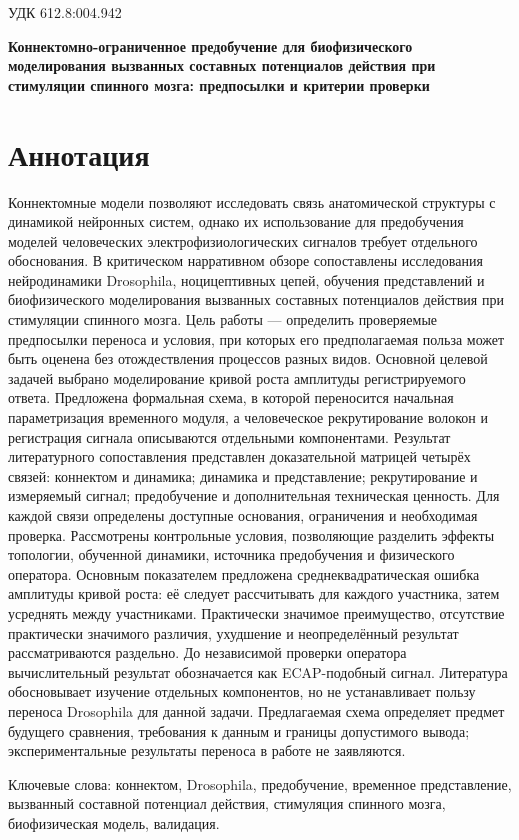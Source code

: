 \documentclass[12pt,a4paper]{article}
\begin{document}
\noindent УДК 612.8:004.942\par
\begin{center}\bfseries\fontsize{14}{17}\selectfont Коннектомно-ограниченное предобучение для биофизического моделирования вызванных составных потенциалов действия при стимуляции спинного мозга: предпосылки и критерии проверки\end{center}
\section*{Аннотация}
Коннектомные модели позволяют исследовать связь анатомической структуры с динамикой нейронных систем, однако их использование для предобучения моделей человеческих электрофизиологических сигналов требует отдельного обоснования. В критическом нарративном обзоре сопоставлены исследования нейродинамики Drosophila, ноцицептивных цепей, обучения представлений и биофизического моделирования вызванных составных потенциалов действия при стимуляции спинного мозга. Цель работы — определить проверяемые предпосылки переноса и условия, при которых его предполагаемая польза может быть оценена без отождествления процессов разных видов. Основной целевой задачей выбрано моделирование кривой роста амплитуды регистрируемого ответа. Предложена формальная схема, в которой переносится начальная параметризация временного модуля, а человеческое рекрутирование волокон и регистрация сигнала описываются отдельными компонентами. Результат литературного сопоставления представлен доказательной матрицей четырёх связей: коннектом и динамика; динамика и представление; рекрутирование и измеряемый сигнал; предобучение и дополнительная техническая ценность. Для каждой связи определены доступные основания, ограничения и необходимая проверка. Рассмотрены контрольные условия, позволяющие разделить эффекты топологии, обученной динамики, источника предобучения и физического оператора. Основным показателем предложена среднеквадратическая ошибка амплитуды кривой роста: её следует рассчитывать для каждого участника, затем усреднять между участниками. Практически значимое преимущество, отсутствие практически значимого различия, ухудшение и неопределённый результат рассматриваются раздельно. До независимой проверки оператора вычислительный результат обозначается как ECAP-подобный сигнал. Литература обосновывает изучение отдельных компонентов, но не устанавливает пользу переноса Drosophila для данной задачи. Предлагаемая схема определяет предмет будущего сравнения, требования к данным и границы допустимого вывода; экспериментальные результаты переноса в работе не заявляются.\par
\noindent\begin{minipage}{\linewidth}Ключевые слова: коннектом, Drosophila, предобучение, временное представление, вызванный составной потенциал действия, стимуляция спинного мозга, биофизическая модель, валидация.\end{minipage}\par
\end{document}
